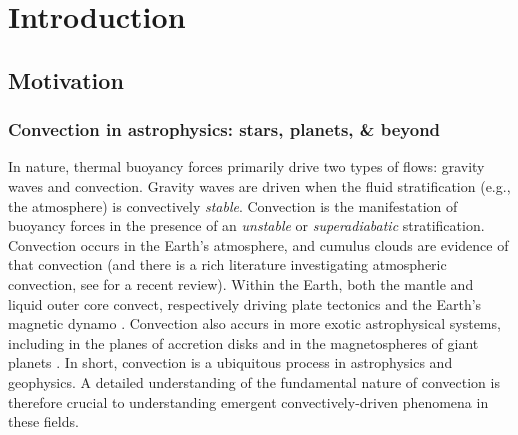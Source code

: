 \chapter{Introduction}
\label{introchap}

\section{Motivation}

\subsection{Convection in astrophysics: stars, planets, \& beyond}
\label{sct:convective_abundance}
In nature, thermal buoyancy forces primarily drive two types of flows: gravity waves and convection.
Gravity waves are driven when the fluid stratification (e.g., the atmosphere) is convectively \emph{stable}.
Convection is the manifestation of buoyancy forces in the presence of an \emph{unstable} or \emph{superadiabatic} stratification.
Convection occurs in the Earth's atmosphere, and cumulus clouds are evidence of that convection (and there is a rich literature investigating atmospheric convection, see \citet{yano2014} for a recent review).
Within the Earth, both the mantle \citep{schubert&all2001} and liquid outer core convect, respectively driving plate tectonics \citep{bercovici2003} and the Earth's magnetic dynamo \citep{christensen2011}.
Convection also accurs in more exotic astrophysical systems, including in the planes of accretion disks \citep{held&latter2018} and in the magnetospheres of giant planets \citep{thomsen&all2012}.
In short, convection is a ubiquitous process in astrophysics and geophysics.
A detailed understanding of the fundamental nature of convection is therefore crucial to understanding emergent convectively-driven phenomena in these fields.

